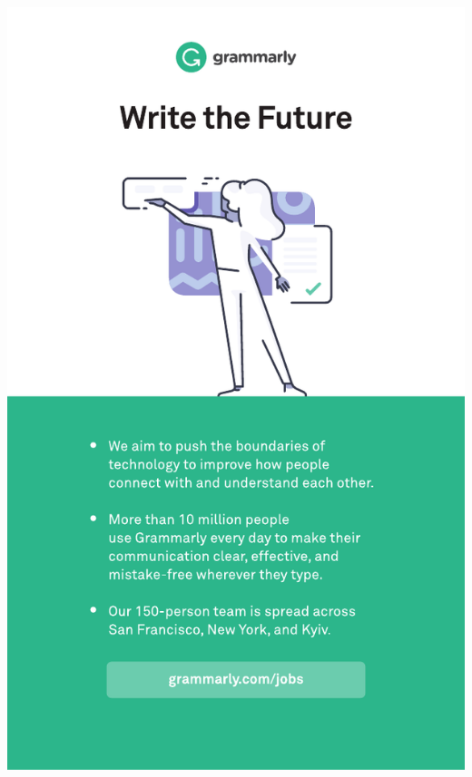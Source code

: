 \thispagestyle{empty}
\begin{center}
  \vfill
  \includegraphics[width=\textwidth]{content/ads/full/grammarly.pdf}
  \vfill
\end{center}

